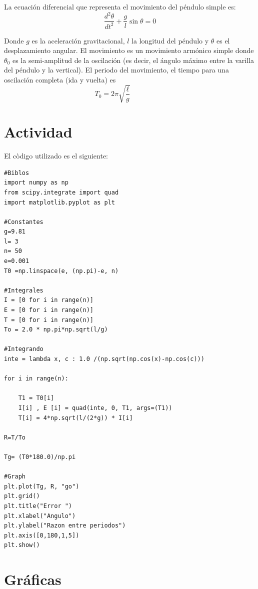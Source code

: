 \documentclass[12pt]{article}
\begin{document}
La ecuación diferencial que representa el movimiento del péndulo simple es:
\begin{equation}
\frac{d^2 \theta}{d t^2}+\frac{g}{l}\sin \theta=0
\end{equation}

Donde $g$ es la aceleración gravitacional, $l$ la longitud del péndulo y $\theta$ es el desplazamiento angular.
El movimiento es un movimiento armónico simple donde $\theta_0$ es la semi-amplitud de la oscilación (es decir, el ángulo máximo entre la varilla del péndulo y la vertical). El periodo del movimiento, el tiempo para una oscilación completa (ida y vuelta) es
\begin{equation}
T_0 = 2 \pi \sqrt {\frac {\ell} {g}} \quad \quad \quad \quad \quad 
\end{equation}
\section{Actividad}

El còdigo utilizado es el siguiente:
\begin{verbatim}
#Biblos
import numpy as np
from scipy.integrate import quad
import matplotlib.pyplot as plt

#Constantes
g=9.81 
l= 3  
n= 50
e=0.001 
T0 =np.linspace(e, (np.pi)-e, n)

#Integrales
I = [0 for i in range(n)]
E = [0 for i in range(n)]
T = [0 for i in range(n)]
To = 2.0 * np.pi*np.sqrt(l/g)

#Integrando
inte = lambda x, c : 1.0 /(np.sqrt(np.cos(x)-np.cos(c)))

for i in range(n):
    
    T1 = T0[i]
    I[i] , E [i] = quad(inte, 0, T1, args=(T1))
    T[i] = 4*np.sqrt(l/(2*g)) * I[i]
       
R=T/To

Tg= (T0*180.0)/np.pi 

#Graph
plt.plot(Tg, R, "go")
plt.grid()
plt.title("Error ")
plt.xlabel("Angulo")
plt.ylabel("Razon entre periodos")
plt.axis([0,180,1,5])
plt.show()
\end{verbatim}
\section{Gráficas}
\end{document}
